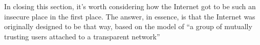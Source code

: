 \documentclass{report}
\begin{document}
\begin{itemize}
            \bigbreak \noindent 
            In closing this section, it’s worth considering how the Internet got to be such an insecure place in the first place. The answer, in essence, is that the Internet was originally designed to be that way, based on the model of “a group of mutually trusting users attached to a transparent network”


    \end{itemize}

    \pagebreak 
    \begin{itemize}
                



    \end{itemize}







    
\end{document}
